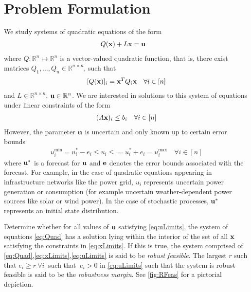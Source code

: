 \section{Problem Formulation} \label{sec:probform}  

We study systems of quadratic equations of the form
\begin{align}
& Q(\mathbf{x})+L\mathbf{x}=\mathbf{u}\label{eq:Quad}
\end{align}
where $Q: \mathbb{R}^n \mapsto \mathbb{R}^n$ is a vector-valued quadratic function, that is, there exist matrices $Q_1,\ldots,Q_n \in \mathbb{R}^{n\times n}$, such that
\[[Q(\mathbf{x})]_i = \mathbf{x}^T Q_{i} \mathbf{x} \quad \forall i \in [n]\]
and $L \in \mathbb{R}^{n\times n}$, $\mathbf{u} \in \mathbb{R}^n$. 
We are interested in solutions to this system of equations under linear constraints of the form
\begin{align}
(A\mathbf{x})_i\leq b_i \quad \forall i \in [n]\label{eq:xLimits}
\end{align}
However, the parameter $\mathbf{u}$ is uncertain and only known up to certain error bounds
\begin{align}
u^{\min}_i=u_i^*-e_i \leq u_i \leq =u_i^*+e_i=u^{\max}_i \quad \forall i \in [n] \label{eq:uLimits}
\end{align}
where $\mathbf{u}^*$ is a forecast for $\mathbf{u}$ and $\mathbf{e}$ denotes the error bounds associated with the forecast. 
For example, in the case of quadratic equations appearing in infrastructure networks like the power grid, $u_i$ represents uncertain power generation or consumption (for example uncertain weather-dependent power sources like solar or wind power). 
In the case of stochastic processes, $\mathbf{u}^*$ represents an initial state distribution.

\begin{cdef}  \label{RobustDef}
Determine whether for all values of $\mathbf{u}$ satisfying \eqref{eq:uLimits}, the system of equations \eqref{eq:Quad} has a solution lying within the interior of the set of all  $\mathbf{x}$ satisfying the constraints in \eqref{eq:xLimits}. 
If this is true, the system comprised of \eqref{eq:Quad},\eqref{eq:xLimits},\eqref{eq:uLimits} is said to be \emph{robust feasible}. 
The largest $r$ such that $e_i\geq r \ \forall i~$ such that $~e_i>0$ in \eqref{eq:uLimits} such that the system is robust feasible is said to be the \emph{robustness margin}. 
See \cref{fig:RFeas} for a pictorial depiction. 
\end{cdef}

